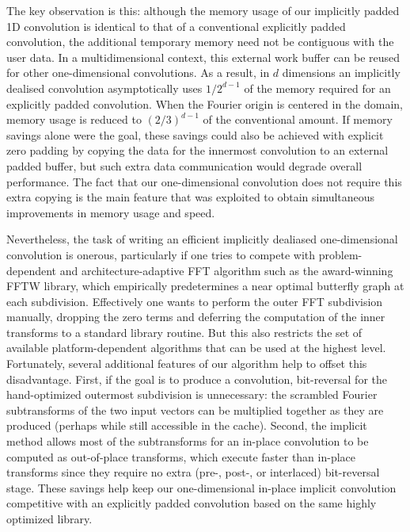 \documentclass[final]{siamltex}
\begin{document}
The key observation is this: although the memory usage of our implicitly
padded 1D convolution is identical to that of a conventional explicitly
padded convolution, the additional temporary memory need not be contiguous
with the user data.  In a multidimensional context, this external work
buffer can be reused for other one-dimensional convolutions.
As a result, in $d$ dimensions an implicitly dealised convolution
asymptotically uses $1/2^{d-1}$ of the
memory required for an explicitly padded convolution. When the Fourier origin is
centered in the domain, memory usage is reduced to $(2/3)^{d-1}$ of the
conventional amount.
If memory savings alone were the goal, these savings could
also be achieved with explicit zero padding by copying the data for the
innermost convolution to an external padded buffer, but such extra data
communication would degrade overall performance. The fact that our
one-dimensional convolution does not require this extra copying is the
main feature that was exploited to obtain simultaneous improvements in
memory usage and speed.

Nevertheless, the task of writing an efficient implicitly dealiased
one-dimensional convolution is onerous, particularly if one tries to
compete with problem-dependent and architecture-adaptive
FFT algorithm such as the award-winning FFTW \cite{Frigo05} library, which
empirically predetermines a near optimal butterfly graph
at each subdivision. Effectively one wants to perform
the outer FFT subdivision manually, dropping the zero terms and
deferring the computation of the inner transforms to a standard library
routine. But this also restricts the set of available platform-dependent
algorithms that can be used at the highest level. Fortunately, several 
additional features of our algorithm help to offset this disadvantage. First, if
the goal is to  produce a convolution, bit-reversal for the hand-optimized
outermost subdivision is unnecessary: the scrambled Fourier subtransforms of the
two input vectors can be multiplied together as they are produced
(perhaps while still accessible in the cache). Second, the implicit
method allows most of the subtransforms for an in-place convolution to
be computed as out-of-place transforms, which execute faster than
in-place transforms since they require no extra (pre-, post-, or
interlaced) bit-reversal stage.  These savings help keep our
one-dimensional in-place implicit convolution competitive with an
explicitly padded convolution based on the same highly optimized
library.
\end{document}
